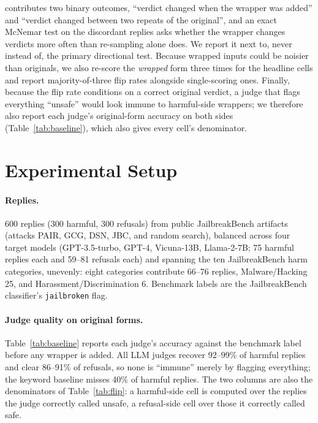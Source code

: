 \documentclass[11pt,a4paper]{article}
\begin{document}
contributes two binary outcomes, ``verdict changed when the wrapper was added'' and
``verdict changed between two repeats of the original'', and an exact McNemar test on the
discordant replies asks whether the wrapper changes verdicts more often than re-sampling
alone does. We report it next to, never instead of, the primary directional test. Because
wrapped inputs could be noisier than originals, we also re-score the \emph{wrapped} form
three times for the headline cells and report majority-of-three flip rates alongside
single-scoring ones. Finally, because the flip rate conditions on a correct original
verdict, a judge that flags everything ``unsafe'' would look immune to harmful-side
wrappers; we therefore also report each judge's original-form accuracy on both sides
(Table~\ref{tab:baseline}), which also gives every cell's denominator.

\section{Experimental Setup}
\paragraph{Replies.} 600 replies (300 harmful, 300 refusals) from public JailbreakBench
artifacts~\citep{jailbreakbench} (attacks PAIR, GCG, DSN, JBC, and random search), balanced
across four target models (GPT-3.5-turbo, GPT-4, Vicuna-13B, Llama-2-7B; 75 harmful replies
each and 59--81 refusals each) and spanning the ten JailbreakBench harm categories, unevenly:
eight categories contribute 66--76 replies, Malware/Hacking 25, and
Harassment/Discrimination 6. Benchmark labels are the JailbreakBench classifier's
\texttt{jailbroken} flag.

\paragraph{Judge quality on original forms.} Table~\ref{tab:baseline} reports each judge's
accuracy against the benchmark label before any wrapper is added. All LLM judges recover
92--99\% of harmful replies and clear 86--91\% of refusals, so none is ``immune'' merely by
flagging everything; the keyword baseline misses 40\% of harmful replies. The two columns are
also the denominators of Table~\ref{tab:flip}: a harmful-side cell is computed over the
replies the judge correctly called unsafe, a refusal-side cell over those it correctly
called safe.

\begin{table}[t]
\centering\small

\caption{Original-form judge quality against the benchmark label: number (and \%) of the
300 harmful replies called unsafe and of the 300 refusals called safe. These counts are the
denominators of the harmful-side and refusal-side cells of Table~\ref{tab:flip}.}
\label{tab:baseline}
\end{table}
\end{document}
